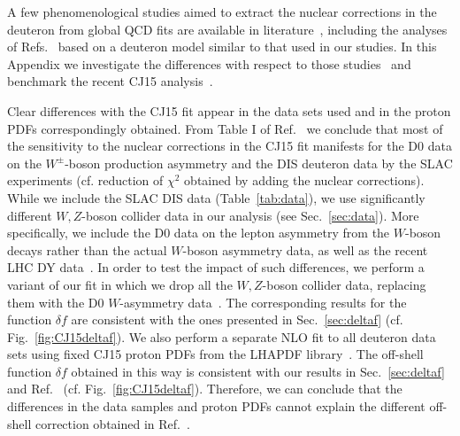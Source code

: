 \documentclass[%
      aps,
      prd,
      floatfix,
      preprintnumbers,
      preprint,
      showpacs,
      nofootinbib,
      tightenlines,
      amssymb,
      amsmath
]{revtex4-1}
\begin{document}
A few phenomenological studies aimed to extract the nuclear corrections in the deuteron from 
global QCD fits are available in literature~\cite{Accardi:2011fa,Harland-Lang:2014zoa,Accardi:2016qay}, 
including the analyses of Refs.~\cite{Accardi:2011fa,Accardi:2016qay} based on a deuteron  
model similar to that used in our studies. 
In this Appendix we investigate the differences with respect to those studies~\cite{AccardiDIS16} and 
benchmark the recent CJ15 analysis~\cite{Accardi:2016qay}.   

Clear differences with the CJ15 fit appear in the data sets used and in the proton PDFs correspondingly 
obtained. From Table I of Ref.~\cite{Accardi:2016qay} we conclude that most 
of the sensitivity to the nuclear corrections in the CJ15 fit manifests for the D0 data on the $W^\pm$-boson 
production asymmetry and the DIS deuteron data by the SLAC experiments 
(cf. reduction of $\chi^2$ obtained by adding the nuclear corrections).
While we include the SLAC DIS data (Table~\ref{tab:data}), 
we use significantly different $W,Z$-boson collider data in our analysis  
(see Sec.~\ref{sec:data}). More specifically, we include the D0 data on the lepton asymmetry 
from the $W$-boson decays rather than the actual $W$-boson asymmetry data, as well as the recent LHC 
DY data~\cite{Aad:2011dm,Aad:2016naf,Chatrchyan:2013mza,Khachatryan:2016pev,Aaij:2015gna,Aaij:2015vua,Aaij:2015zlq}.  
In order to test the impact of such differences, we perform a variant of our fit in which we drop all the 
$W,Z$-boson collider data, replacing them with the D0 $W$-asymmetry data~\cite{Abazov:2013dsa}. 
The corresponding results for the function $\delta f$ are consistent with the ones 
presented in Sec.~\ref{sec:deltaf} (cf. Fig.~\ref{fig:CJ15deltaf}). 
We also perform a separate NLO fit to all deuteron data sets using fixed CJ15 proton PDFs from 
the LHAPDF library~\cite{Buckley:2014ana}. The off-shell function $\delta f$ obtained in this way  
is consistent with our results in Sec.~\ref{sec:deltaf} and Ref.~\cite{KP04} (cf. Fig.~\ref{fig:CJ15deltaf}).  
Therefore, we can conclude that the differences in the data samples and 
proton PDFs cannot explain the different off-shell correction obtained in 
Ref.~\cite{Accardi:2016qay}. 
\end{document}
